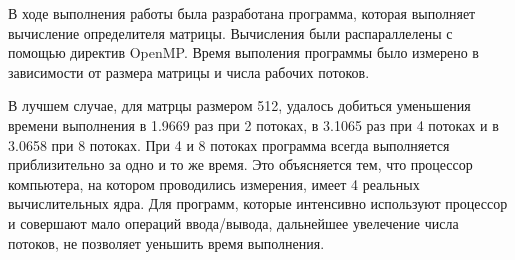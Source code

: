 \documentclass[a4paper,14pt]{extarticle}
\begin{document}
    В ходе выполнения работы была разработана программа, которая выполняет вычисление определителя матрицы.
    Вычисления были распараллелены с помощью директив OpenMP\@.
    Время выполения программы было измерено в зависимости от размера матрицы и числа рабочих потоков.

    В лучшем случае, для матрцы размером 512,
    удалось добиться уменьшения времени выполнения в 1.9669 раз при 2 потоках, в 3.1065 раз при 4 потоках и в 3.0658 при 8 потоках.
    При 4 и 8 потоках программа всегда выполняется приблизительно за одно и то же время.
    Это объясняется тем, что процессор компьютера, на котором проводились измерения,
    имеет 4 реальных вычислительных ядра.
    Для программ, которые интенсивно используют процессор и совершают мало операций ввода/вывода,
    дальнейшее увелечение числа потоков, не позволяет уеньшить время выполнения.
\end{document}

